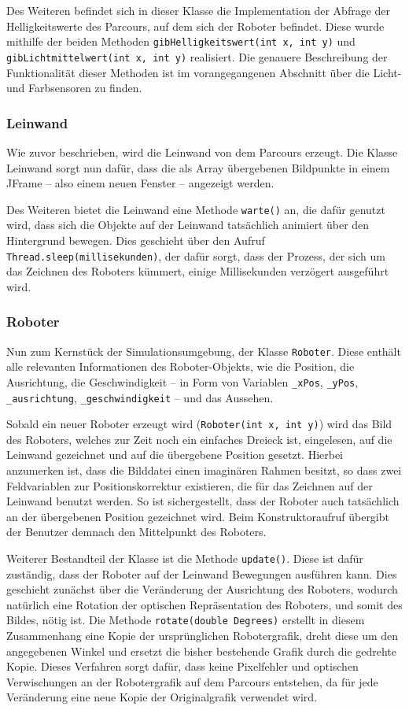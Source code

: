 \documentclass[paper=a4, DIV=calc, BCOR=15mm, twoside=on, onecolumn=on, open = right, titlepage =on, parskip =half, headsepline = on, footsepline = on, chapterprefix = off, appendixprefix = off, fontsize = 12pt, numbers = noenddot, abstract = on]{scrbook}
\begin{document}
Des Weiteren befindet sich in dieser Klasse die Implementation der Abfrage der Helligkeitswerte des Parcours, auf dem sich der Roboter befindet. Diese wurde mithilfe der beiden Methoden \texttt{gib\-Hellig\-keits\-wert(int x, int y)} und \texttt{gib\-Licht\-mittel\-wert(int x, int y)} realisiert. Die genauere Beschreibung der Funktionalität dieser Methoden ist im vorangegangenen Abschnitt über die Licht- und Farbsensoren zu finden.

\subsubsection{Leinwand}
Wie zuvor beschrieben, wird die Leinwand von dem Parcours erzeugt. Die Klasse Leinwand sorgt nun dafür, dass die als Array übergebenen Bildpunkte in einem JFrame -- also einem neuen Fenster -- angezeigt werden.

Des Weiteren bietet die Leinwand eine Methode \texttt{warte()} an, die dafür genutzt wird, dass sich die Objekte auf der Leinwand tatsächlich animiert über den Hintergrund bewegen. Dies geschieht über den Aufruf \texttt{Thread.sleep(millise\-kun\-den)}, der dafür sorgt, dass der Prozess, der sich um das Zeichnen des Roboters kümmert, einige Millisekunden verzögert ausgeführt wird.

\subsubsection{Roboter}
Nun zum Kernstück der Simulationsumgebung, der Klasse \texttt{Roboter}. Diese enthält alle relevanten Informationen des Roboter-Objekts, wie die Position, die Ausrichtung, die Geschwindigkeit -- in Form von Variablen \texttt{{\_}xPos}, \texttt{{\_}yPos}, \texttt{{\_}aus\-rich\-tung},  \texttt{{\_}ge\-schwin\-dig\-keit} -- und das Aussehen. 

Sobald ein neuer Roboter erzeugt wird (\texttt{Roboter(int x, int y)}) wird das Bild des Roboters, welches zur Zeit noch ein einfaches Dreieck ist, eingelesen, auf die Leinwand gezeichnet und auf die übergebene Position gesetzt. Hierbei anzumerken ist, dass die Bilddatei einen imaginären Rahmen besitzt, so dass zwei Feldvariablen zur Positionskorrektur existieren, die für das Zeichnen auf der Leinwand benutzt werden. So ist sichergestellt, dass der Roboter auch tatsächlich an der übergebenen Position gezeichnet wird. Beim Konstruktoraufruf übergibt der Benutzer demnach den Mittelpunkt des Roboters.

Weiterer Bestandteil der Klasse ist die Methode \texttt{update()}. Diese ist dafür zuständig, dass der Roboter auf der Leinwand Bewegungen ausführen kann. Dies geschieht zunächst über die Veränderung der Ausrichtung des Roboters, wodurch natürlich eine Rotation der optischen Repräsentation des Roboters, und somit des Bildes, nötig ist. Die Methode \texttt{rotate(double Degrees)} erstellt in diesem Zusammenhang eine Kopie der ursprünglichen Robotergrafik, dreht diese um den angegebenen Winkel und ersetzt die bisher bestehende Grafik durch die gedrehte Kopie. Dieses Verfahren sorgt dafür, dass keine Pixelfehler und optischen Verwischungen an der Robotergrafik auf dem Parcours entstehen, da für jede Veränderung eine neue Kopie der Originalgrafik verwendet wird.
\end{document}

